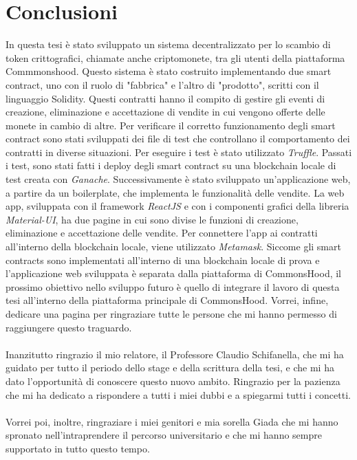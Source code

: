 \documentclass[a4paper]{article}
\begin{document}
        \newpage
        \section{Conclusioni}
        In questa tesi è stato sviluppato un sistema decentralizzato per lo scambio di token crittografici, chiamate anche criptomonete, tra gli utenti della piattaforma Commmonshood. Questo sistema è stato costruito implementando
        due smart contract, uno con il ruolo di "fabbrica" e l'altro di "prodotto", scritti con il linguaggio Solidity. Questi contratti hanno il compito di gestire gli eventi di creazione, eliminazione e accettazione di vendite in cui vengono offerte delle monete in cambio di altre.
        Per verificare il corretto funzionamento degli smart contract sono stati sviluppati dei file di test che controllano il comportamento dei contratti in diverse situazioni. Per eseguire i test è stato utilizzato \emph{Truffle}. Passati i test, sono stati fatti i deploy degli smart contract
        su una blockchain locale di test creata con \emph{Ganache}.
        Successivamente è stato sviluppato un'applicazione web, a partire da un boilerplate, che implementa le funzionalità delle vendite. La web app, sviluppata con il framework \emph{ReactJS} e con i componenti grafici della libreria \emph{Material-UI}, ha due pagine in cui sono divise le funzioni
        di creazione, eliminazione e accettazione delle vendite. Per connettere l'app ai contratti all'interno della blockchain locale, viene utilizzato \emph{Metamask}. Siccome gli smart contracts sono implementati all'interno di una blockchain locale di prova e l'applicazione web sviluppata è separata dalla
        piattaforma di CommonsHood, il prossimo obiettivo nello sviluppo futuro è quello di integrare il lavoro di questa tesi all'interno della piattaforma principale di CommonsHood.
        \newpage
        Vorrei, infine, dedicare una pagina per ringraziare tutte le persone che mi hanno permesso di raggiungere questo traguardo.
        \\
        \\
        Inanzitutto ringrazio il mio relatore, il Professore Claudio Schifanella, che mi ha guidato per tutto il periodo dello stage e della scrittura della tesi, e che mi ha dato l'opportunità
        di conoscere questo nuovo ambito. Ringrazio per la pazienza che mi ha dedicato a rispondere a tutti i miei dubbi e a spiegarmi tutti i concetti.
        \\
        \\
        Vorrei poi, inoltre, ringraziare i miei genitori e mia sorella Giada che mi hanno spronato nell'intraprendere il percorso universitario e che mi hanno sempre supportato in tutto questo tempo.
\end{document}
